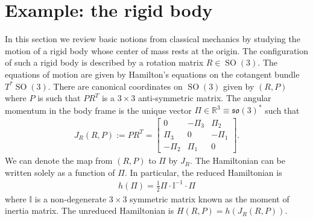 \documentclass[12pt]{amsart}
\newcommand{\so}{\ensuremath{\mathfrak{so}}}
\DeclareMathOperator{\SO}{SO}
\begin{document}
\section{Example: the rigid body}
\label{sec:rigid_body}
  In this section we review basic notions from classical mechanics
by studying the motion of a rigid body whose center of mass rests
at the origin.
The configuration of such a rigid body is described by a
rotation matrix $R \in \SO(3)$.
The equations of motion are given by Hamilton's equations
on the cotangent bundle $T^{\ast}\SO(3)$.
There are canonical coordinates on $\SO(3)$ given by $(R,P)$
where $P$ is such that $P R^T$ is a $3 \times 3$ anti-symmetric matrix.
The angular momentum in the body frame is the
unique vector $\Pi \in \mathbb{R}^3 \equiv \so(3)^*$ such that
\begin{align*}
  J_R(R,P) := PR^T = \begin{bmatrix}
    0 & -\Pi_3 & \Pi_2 \\
    \Pi_3 & 0 & -\Pi_1 \\
    -\Pi_2 & \Pi_1 & 0 
    \end{bmatrix}.
\end{align*}
We can denote the map from $(R,P)$ to $\Pi$ by $J_R$.
The Hamiltonian can be written solely as a function
of $\Pi$.  In particular, the reduced Hamiltonian is
\begin{align*}
  h(\Pi) = \frac{1}{2}\Pi \cdot \mathbb{I}^{-1} \cdot \Pi
\end{align*}
where $\mathbb{I}$ is a non-degenerate $3\times 3$ symmetric matrix
known as the moment of inertia matrix.
The unreduced Hamiltonian is $H(R,P) = h(J_R(R,P))$.
\end{document}
